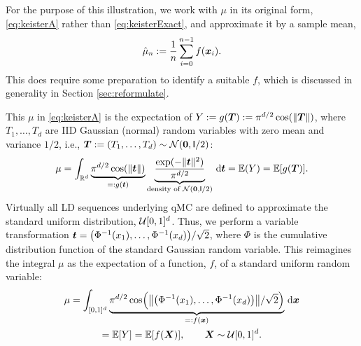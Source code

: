 \documentclass{svproc}
\begin{document}
For the purpose of this illustration, we work with $\mu$ in its original form, \eqref{eq:keisterA} rather than \eqref{eq:keisterExact}, and approximate it by a sample mean,
\begin{equation} \label{eq:sample_mean}
	\hat{\mu}_n := \frac 1n \sum_{i=0}^{n-1} f({\boldsymbol{x}}_i).
\end{equation}
This does require some preparation to identify a suitable $f$, which is discussed in generality in Section \ref{sec:reformulate}.

This $\mu$ in \eqref{eq:keisterA} is the expectation of $Y := g({\boldsymbol{T}}) := \pi^{d/2} \cos(\lVert {\boldsymbol{T}} \rVert)$, where $T_1, \ldots, T_d$ are IID Gaussian (normal) random variables with zero mean and variance $1/2$, i.e., ${\boldsymbol{T}} :=(T_1, \ldots, T_d) \sim {\mathcal{N}}({\boldsymbol{0}},\mathsf{I}/2)$:
\begin{equation}\label{eq:keisterB}
	\mu = \int_{\mathbb{R}^d} \underbrace{\pi^{d/2} \cos(\lVert {\boldsymbol{t}} \rVert)}_{=:g({\boldsymbol{t}})}  \underbrace{\frac{\exp(-\lVert {\boldsymbol{t}} \rVert^2)}{\pi^{d/2}}}_{\text{density of } {\mathcal{N}}({\boldsymbol{0}},\mathsf{I}/2)} \, {\mathrm{d}} {\boldsymbol{t}} = {\mathbb{E}}(Y) = {\mathbb{E}}[g({\boldsymbol{T}})].
\end{equation}
Virtually all LD sequences underlying qMC are defined to approximate the standard uniform distribution, ${\mathcal{U}}[0,1]^d$.  Thus, we perform a variable transformation ${\boldsymbol{t}} = \bigl (\Phi^{-1}(x_1), \ldots, \Phi^{-1}(x_d) \bigr )/\sqrt{2}$,
where $\Phi$ is the cumulative distribution function of the standard Gaussian random variable.  This reimagines the integral $\mu$ as the expectation of a function, $f$, of a standard uniform random variable:
\begin{multline}\label{eq:keisterC}
	\mu = \int_{[0,1]^d} \underbrace{\pi^{d/2} \cos\Bigl (\bigl \lVert \bigl( \Phi^{-1}(x_1), \ldots, \Phi^{-1}(x_d)\bigr) \bigr\rVert/\sqrt{2}  \Bigr)}_{=:f({\boldsymbol{x}})} \, {\mathrm{d}} {\boldsymbol{x}} \\
	= {\mathbb{E}}[Y]
	= {\mathbb{E}}[f({\boldsymbol{X}})], \qquad {\boldsymbol{X}} \sim {\mathcal{U}}[0,1]^d.
\end{multline}
\end{document}
